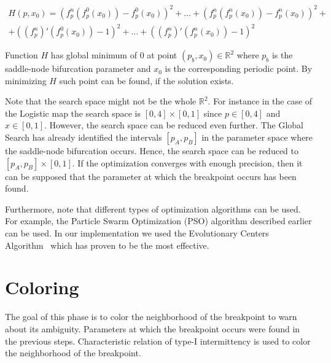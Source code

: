 \begin{multline*} 
H(p, x_0) = (f_{p}^{n}(f_{p}^{0}(x_0)) - f_{p}^{0}(x_0))^2 + \dots + (f_{p}^{n}(f_{p}^{n}(x_0)) - f_{p}^{n}(x_0))^2 + \\
    + ((f_{p}^{n})'(f_{p}^{0}(x_0)) -1)^2 + \dots + ((f_{p}^{n})'(f_{p}^{n}(x_0)) -1)^2
\end{multline*}

Function $H$ has global minimum of $0$ at point $(p_{b}, x_0) \in \mathbb{R}^{2}$ where $p_{b}$ is the saddle-node bifurcation parameter and $x_0$ is the corresponding periodic point.
By minimizing $H$ such point can be found, if the solution exists.
\par
Note that the search space might not be the whole $\mathbb{R}^{2}$.
For instance in the case of the Logistic map the search space is $[0, 4] \times [0, 1]$ since $p \in [0,4]$ and $x \in [0,1]$.
However, the search space can be reduced even further.
The Global Search has already identified the intervals $[p_A, p_B]$ in the parameter space where the saddle-node bifurcation occurs.
Hence, the search space can be reduced to $[p_A, p_B] \times [0, 1]$.
If the optimization converges with enough precision, then it can be supposed that the parameter at which the breakpoint occurs has been found.
\par
Furthermore, note that different types of optimization algorithms can be used.
For example, the Particle Swarm Optimization (PSO) algorithm described earlier can be used.
In our implementation we used the Evolutionary Centers Algorithm~\cite{MejiadeDios20190913} which has proven to be the most effective.

\section{Coloring}
The goal of this phase is to color the neighborhood of the breakpoint to warn about its ambiguity.
Parameters at which the breakpoint occurs were found in the previous steps.
Characteristic relation of type-I intermittency is used to color the neighborhood of the breakpoint.

